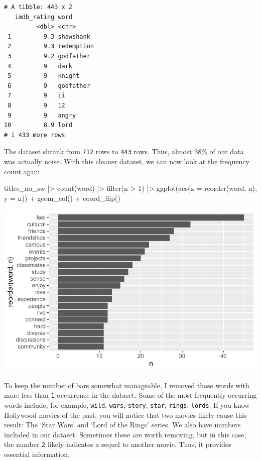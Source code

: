 \documentclass[
  letterpaper,
]{krantz}
\makeatletter
\newenvironment{Shaded}{\begin{snugshade}}{\end{snugshade}}
\newcommand{\AttributeTok}[1]{\textcolor[rgb]{0.40,0.45,0.13}{#1}}
\newcommand{\DecValTok}[1]{\textcolor[rgb]{0.68,0.00,0.00}{#1}}
\newcommand{\FunctionTok}[1]{\textcolor[rgb]{0.28,0.35,0.67}{#1}}
\newcommand{\NormalTok}[1]{\textcolor[rgb]{0.00,0.23,0.31}{#1}}
\newcommand{\SpecialCharTok}[1]{\textcolor[rgb]{0.37,0.37,0.37}{#1}}
\newenvironment{kframe}{%
\medskip{}
\setlength{\fboxsep}{.8em}
 \def\at@end@of@kframe{}%
 \ifinner\ifhmode%
  \def\at@end@of@kframe{\end{minipage}}%
  \begin{minipage}{\columnwidth}%
 \fi\fi%
 \def\FrameCommand##1{\hskip\@totalleftmargin \hskip-\fboxsep
 \colorbox{shadecolor}{##1}\hskip-\fboxsep
     \hskip-\linewidth \hskip-\@totalleftmargin \hskip\columnwidth}%
 \MakeFramed {\advance\hsize-\width
   \@totalleftmargin\z@ \linewidth\hsize
   \@setminipage}}%
 {\par\unskip\endMakeFramed%
 \at@end@of@kframe}
\renewenvironment{Shaded}{\begin{kframe}}{\end{kframe}}
\makeatother
\begin{document}
\begin{verbatim}
# A tibble: 443 x 2
   imdb_rating word      
         <dbl> <chr>     
 1         9.3 shawshank 
 2         9.3 redemption
 3         9.2 godfather 
 4         9   dark      
 5         9   knight    
 6         9   godfather 
 7         9   ii        
 8         9   12        
 9         9   angry     
10         8.9 lord      
# i 433 more rows
\end{verbatim}

The dataset shrank from \texttt{712} rows to \texttt{443} rows. Thus,
almost 38\% of our data was actually noise. With this cleaner dataset,
we can now look at the frequency count again.

\begin{Shaded}
\begin{Highlighting}[]
\NormalTok{titles\_no\_sw }\SpecialCharTok{|\textgreater{}}
  \FunctionTok{count}\NormalTok{(word) }\SpecialCharTok{|\textgreater{}}
  \FunctionTok{filter}\NormalTok{(n }\SpecialCharTok{\textgreater{}} \DecValTok{1}\NormalTok{) }\SpecialCharTok{|\textgreater{}}
  \FunctionTok{ggplot}\NormalTok{(}\FunctionTok{aes}\NormalTok{(}\AttributeTok{x =} \FunctionTok{reorder}\NormalTok{(word, n),}
             \AttributeTok{y =}\NormalTok{ n)) }\SpecialCharTok{+}
  \FunctionTok{geom\_col}\NormalTok{() }\SpecialCharTok{+}
  \FunctionTok{coord\_flip}\NormalTok{()}
\end{Highlighting}
\end{Shaded}

\includegraphics{14_mixed_methods_files/figure-pdf/freq-after-stopwords-removal-1.pdf}

To keep the number of bars somewhat manageable, I removed those words
with more less than \texttt{1} occurrence in the dataset. Some of the
most frequently occurring words include, for example, \texttt{wild},
\texttt{wars}, \texttt{story}, \texttt{star}, \texttt{rings},
\texttt{lords}. If you know Hollywood movies of the past, you will
notice that two movies likely cause this result: The `Star Wars' and
`Lord of the Rings' series. We also have numbers included in our
dataset. Sometimes these are worth removing, but in this case, the
number \texttt{2} likely indicates a sequel to another movie. Thus, it
provides essential information.
\end{document}
